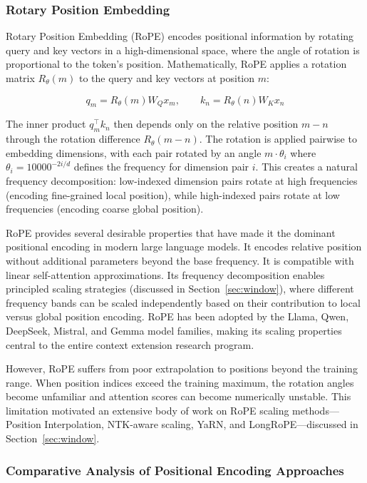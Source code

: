 \documentclass[11pt,letterpaper]{article}
\begin{document}
\subsubsection{Rotary Position Embedding}

Rotary Position Embedding (RoPE) \cite{su2024roformer} encodes positional information by rotating query and key vectors in a high-dimensional space, where the angle of rotation is proportional to the token's position. Mathematically, RoPE applies a rotation matrix $R_\theta(m)$ to the query and key vectors at position $m$:

\begin{equation}
q_m = R_\theta(m) W_Q x_m, \qquad k_n = R_\theta(n) W_K x_n
\end{equation}

The inner product $q_m^\top k_n$ then depends only on the relative position $m - n$ through the rotation difference $R_\theta(m-n)$. The rotation is applied pairwise to embedding dimensions, with each pair rotated by an angle $m \cdot \theta_i$ where $\theta_i = 10000^{-2i/d}$ defines the frequency for dimension pair $i$. This creates a natural frequency decomposition: low-indexed dimension pairs rotate at high frequencies (encoding fine-grained local position), while high-indexed pairs rotate at low frequencies (encoding coarse global position).

RoPE provides several desirable properties that have made it the dominant positional encoding in modern large language models. It encodes relative position without additional parameters beyond the base frequency. It is compatible with linear self-attention approximations. Its frequency decomposition enables principled scaling strategies (discussed in Section~\ref{sec:window}), where different frequency bands can be scaled independently based on their contribution to local versus global position encoding. RoPE has been adopted by the Llama, Qwen, DeepSeek, Mistral, and Gemma model families, making its scaling properties central to the entire context extension research program.

However, RoPE suffers from poor extrapolation to positions beyond the training range. When position indices exceed the training maximum, the rotation angles become unfamiliar and attention scores can become numerically unstable. This limitation motivated an extensive body of work on RoPE scaling methods---Position Interpolation, NTK-aware scaling, YaRN, and LongRoPE---discussed in Section~\ref{sec:window}.

\subsubsection{Comparative Analysis of Positional Encoding Approaches}
\end{document}

